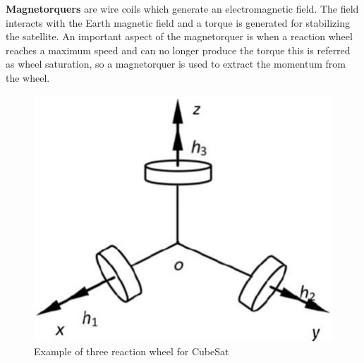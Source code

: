 \textbf{Magnetorquers} are wire coils which generate an electromagnetic field. The field interacts with the Earth magnetic field and a torque is generated for stabilizing the satellite. An important aspect of the magnetorquer is when a reaction wheel reaches a maximum speed and can no longer produce the torque this is referred as wheel saturation, so a magnetorquer is used to extract the momentum from the wheel.
%
\begin{table}[H]
	\begin{minipage}[b]{0.49\linewidth}
		\centering
		\begin{figure}[H]
			\centering
			\includegraphics[width=0.9\linewidth]{figures/RW}
			\caption{Example of three reaction wheel for CubeSat}
			\label{fig:MW}
		\end{figure}
	\end{minipage}\hfill
	\begin{minipage}[b]{0.49\linewidth}
		\centering
		\begin{figure}[H]
			\centering

\end{figure}
\end{minipage}
\end{table}
